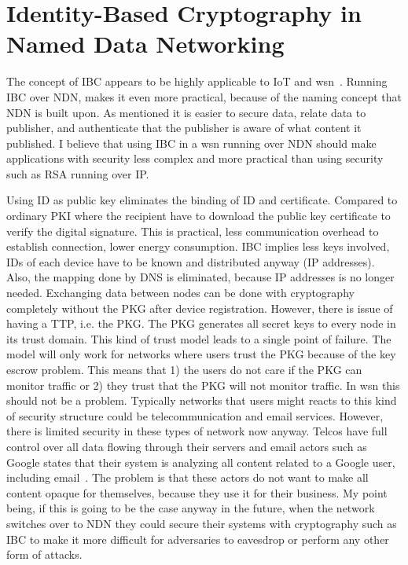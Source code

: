 
\section{Identity-Based Cryptography in Named Data Networking}
The concept of \gls{IBC} appears to be highly applicable to \gls{IoT} and \gls{wsn}~\cite{Patil:2012:SWS:2464778}.
Running \gls{IBC} over \gls{NDN}, makes it even more practical, because of the naming concept that \gls{NDN} is built upon. 
As mentioned it is easier to secure data, relate data to publisher, and authenticate that the publisher is aware of what content it published. 
I believe that using \gls{IBC} in a \gls{wsn} running over \gls{NDN} should make applications with security less complex and more practical than using security such as RSA running over \gls{IP}. 

Using \gls{ID} as public key eliminates the binding of ID and certificate. 
Compared to ordinary \gls{PKI} where the recipient have to download the public key certificate to verify the digital signature.
This is practical, less communication overhead to establish connection, lower energy consumption.
\gls{IBC} implies less keys involved, IDs of each device have to be known and distributed anyway (IP addresses).
Also, the mapping done by \gls{DNS} is eliminated, because IP addresses is no longer needed.
Exchanging data between nodes can be done with cryptography completely without the \gls{PKG} after device registration.
However, there is issue of having a \gls{TTP}, i.e. the \gls{PKG}.
The \gls{PKG} generates all secret keys to every node in its trust domain. 
This kind of trust model leads to a single point of failure.
The model will only work for networks where users trust the \gls{PKG} because of the key escrow problem.
This means that 1) the users do not care if the \gls{PKG} can monitor traffic or 2) they trust that the \gls{PKG} will not monitor traffic.
In \gls{wsn} this should not be a problem.
Typically networks that users might reacts to this kind of security structure could be telecommunication and email services. 
However, there is limited security in these types of network now anyway. 
Telcos have full control over all data flowing through their servers and email actors such as Google states that their system is analyzing all content related to a Google user, including email~\cite{google_reads_email}.
The problem is that these actors do not want to make all content opaque for themselves, because they use it for their business. 
My point being, if this is going to be the case anyway in the future, when the network switches over to \gls{NDN} they could secure their systems with cryptography such as \gls{IBC} to make it more difficult for adversaries to eavesdrop or perform any other form of attacks.

